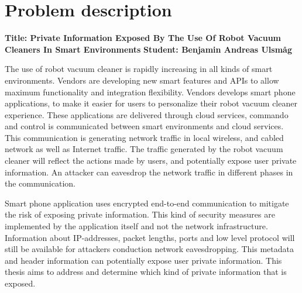 \chapter*{Problem description}


\textbf{Title: Private Information Exposed By The Use Of Robot Vacuum Cleaners In Smart Environments}
\newline
\textbf{Student: Benjamin Andreas Ulsmåg}
\newline
\newline

The use of robot vacuum cleaner is rapidly increasing in all kinds of smart environments. Vendors are developing new smart features and APIs to allow maximum functionality and integration flexibility. Vendors develops smart phone applications, to make it easier for users to personalize their robot vacuum cleaner experience. These applications are delivered through cloud services, commando and control is communicated between smart environments and cloud services. This communication is generating network traffic in local wireless, and cabled network as well as Internet traffic. The traffic generated by the robot vacuum cleaner will reflect the actions made by users, and potentially expose user private information. An attacker can eavesdrop the network traffic in different phases in the communication. 

Smart phone application uses encrypted end-to-end communication to mitigate the risk of exposing private information. This kind of security measures are implemented by the application itself and not the network infrastructure. Information about IP-addresses, packet lengths, ports and low level protocol will still be available for attackers conduction network eavesdropping. This metadata and header information can potentially expose user private information. This thesis aims to address and determine which kind of private information that is exposed. 




